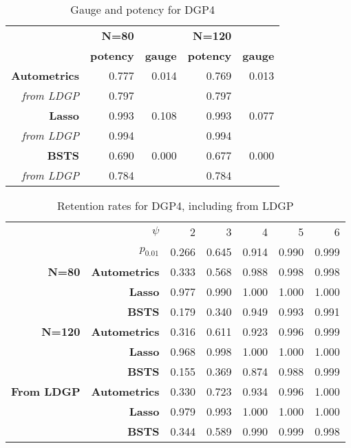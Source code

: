 \documentclass[11pt, oneside]{book}   	%
\begin{document}
\begin{table}[htbp]
  \centering

    \begin{tabular}{rrrrr}

                   & \textbf{N=80} & \textbf{} & \textbf{N=120} & \textbf{} \\

          & \textbf{potency} & \textbf{gauge} & \textbf{potency} & \textbf{gauge} \\
    \textbf{Autometrics} & 0.777 & 0.014 & 0.769 & 0.013 \\
    \textit{from LDGP} & 0.797 &       & 0.797 &  \\
    \textbf{Lasso} & 0.993 & 0.108 & 0.993 & 0.077 \\
    \textit{from LDGP} & 0.994 &       & 0.994 &  \\
    \textbf{BSTS} & 0.690 & 0.000 & 0.677 & 0.000 \\
    \textit{from LDGP} & 0.784 &       & 0.784 &  \\

    \end{tabular}%
      \caption{Gauge and potency for DGP4}
  \label{DGP4GP}%
  
\end{table}%



     
\begin{table}[htbp]
  \centering

    \begin{tabular}{rrrrrrr}

          & \boldmath{}\textbf{$\psi$}\unboldmath{} & 2     & 3     & 4     & 5     & 6 \\

          & \boldmath{}\textbf{$p_{0.01}$}\unboldmath{}  & 0.266 & 0.645 & 0.914 & 0.990 & 0.999  \\
    \textbf{N=80} & \textbf{Autometrics} & 0.333 & 0.568 & 0.988 & 0.998 & 0.998 \\
    \textbf{} & \textbf{Lasso} & 0.977 & 0.990 & 1.000 & 1.000 & 1.000 \\
    \textbf{} & \textbf{BSTS} & 0.179 & 0.340 & 0.949 & 0.993 & 0.991 \\
    \textbf{N=120} & \textbf{Autometrics} & 0.316 & 0.611 & 0.923 & 0.996 & 0.999 \\
    \textbf{} & \textbf{Lasso} & 0.968 & 0.998 & 1.000 & 1.000 & 1.000 \\
    \textbf{} & \textbf{BSTS} & 0.155 & 0.369 & 0.874 & 0.988 & 0.999 \\
    \textbf{From LDGP} & \textbf{Autometrics} & 0.330 & 0.723 & 0.934 & 0.996 & 1.000 \\
          & \textbf{Lasso} & 0.979 & 0.993 & 1.000 & 1.000 & 1.000 \\
          & \textbf{BSTS} & 0.344 & 0.589 & 0.990 & 0.999 & 0.998 \\

    \end{tabular}%
      \caption{Retention rates for DGP4, including from LDGP}
  \label{tDGP4RR}%
\end{table}%
\end{document}
